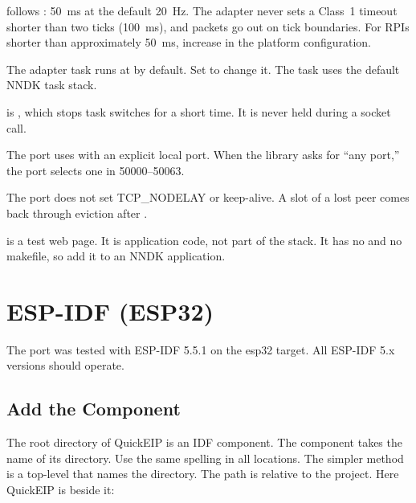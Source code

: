 \begin{description}[font=\sffamily\bfseries\color{steel}]
  \item[Clock resolution.]  follows : 50~ms
        at the default 20~Hz. The adapter never sets a Class~1 timeout shorter
        than two ticks (100~ms), and \TO{} packets go out on tick boundaries.
        For RPIs shorter than approximately 50~ms, increase
         in the platform configuration.
  \item[Task.] The adapter task runs at  by default. Set
         to change it. The task uses the
        default NNDK task stack.
  \item[Lock.]  is , which stops task
        switches for a short time. It is never held during a socket call.
  \item[UDP sockets.] The port uses  with an
        explicit local port. When the library asks for ``any port,'' the port
        selects one in 50000--50063.
  \item[TCP options.] The port does not set TCP\_NODELAY or keep-alive. A slot
        of a lost peer comes back through eviction after
        .
  \item[Web UI.]  is a test web page. It is
        application code, not part of the stack. It has no  and no
        makefile, so add it to an NNDK application.
\end{description}

\section{ESP-IDF (ESP32)}\label{sec:espidf}

The port was tested with ESP-IDF 5.5.1 on the esp32 target. All ESP-IDF 5.x
versions should operate.

\subsection{Add the Component}

The root directory of QuickEIP is an IDF component. The component takes the
name of its directory. Use the same spelling in all locations. The simpler
method is a top-level  that names the directory. The
path is relative to the project. Here QuickEIP is beside it:

